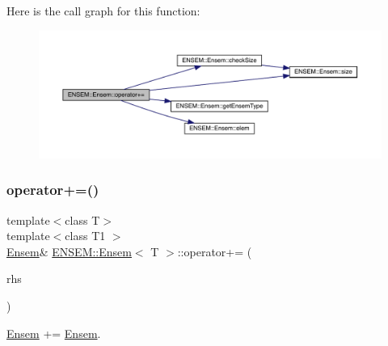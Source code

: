 Here is the call graph for this function\+:
\nopagebreak
\begin{figure}[H]
\begin{center}
\leavevmode
\includegraphics[width=350pt]{d7/d3e/classENSEM_1_1Ensem_ae24bd27a7f5a8ffed6ad4361956596fd_cgraph}
\end{center}
\end{figure}
\mbox{\label{classENSEM_1_1Ensem_ae24bd27a7f5a8ffed6ad4361956596fd}} 
\subsubsection{\texorpdfstring{operator+=()}{operator+=()}\hspace{0.1cm}{\footnotesize\ttfamily [4/4]}}
{\footnotesize\ttfamily template$<$class T$>$ \\
template$<$class T1 $>$ \\
\mbox{\hyperlink{classENSEM_1_1Ensem}{Ensem}}\& \mbox{\hyperlink{classENSEM_1_1Ensem}{E\+N\+S\+E\+M\+::\+Ensem}}$<$ T $>$\+::operator+= (\begin{DoxyParamCaption}\item[{const \mbox{\hyperlink{classENSEM_1_1Ensem}{Ensem}}$<$ T1 $>$ \&}]{rhs }\end{DoxyParamCaption})\hspace{0.3cm}{\ttfamily [inline]}}



\mbox{\hyperlink{classENSEM_1_1Ensem}{Ensem}} += \mbox{\hyperlink{classENSEM_1_1Ensem}{Ensem}}. 

